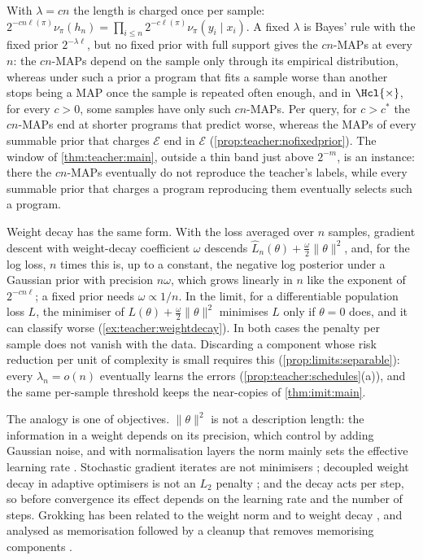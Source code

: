 \begin{remark}[$\lambda=cn$ and weight decay]\label{rem:teacher:weightdecay}
With $\lambda=cn$ the length is charged once per sample: $2^{-cn\ell(\pi)}\nu_\pi(h_n)=\prod_{i\le n}2^{-c\ell(\pi)}\nu_\pi(y_i\mid x_i)$. A fixed $\lambda$ is Bayes' rule with the fixed prior $2^{-\lambda\ell}$, but no fixed prior with full support gives the $cn$-MAPs at every $n$: the $cn$-MAPs depend on the sample only through its empirical distribution, whereas under such a prior a program that fits a sample worse than another stops being a MAP once the sample is repeated often enough, and in $\Hcl{\times}$, for every $c>0$, some samples have only such $cn$-MAPs. Per query, for $c>c^*$ the $cn$-MAPs end at shorter programs that predict worse, whereas the MAPs of every summable prior that charges $\mathcal E$ end in $\mathcal E$ (\cref{prop:teacher:nofixedprior}). The window of \cref{thm:teacher:main}, outside a thin band just above $2^{-m}$, is an instance: there the $cn$-MAPs eventually do not reproduce the teacher's labels, while every summable prior that charges a program reproducing them eventually selects such a program.

Weight decay \citep{krogh1992simple} has the same form. With the loss averaged over $n$ samples, gradient descent with weight-decay coefficient $\omega$ descends $\hat L_n(\theta)+\frac\omega2\|\theta\|^2$, and, for the log loss, $n$ times this is, up to a constant, the negative log posterior under a Gaussian prior \citep{mackay1992practical} with precision $n\omega$, which grows linearly in $n$ like the exponent of $2^{-cn\ell}$; a fixed prior needs $\omega\propto1/n$. In the limit, for a differentiable population loss $L$, the minimiser of $L(\theta)+\frac\omega2\|\theta\|^2$ minimises $L$ only if $\theta=0$ does, and it can classify worse (\cref{ex:teacher:weightdecay}). In both cases the penalty per sample does not vanish with the data. Discarding a component whose risk reduction per unit of complexity is small requires this (\cref{prop:limits:separable}): every $\lambda_n=o(n)$ eventually learns the errors (\cref{prop:teacher:schedules}(a)), and the same per-sample threshold keeps the near-copies of \cref{thm:imit:main}.

The analogy is one of objectives. $\|\theta\|^2$ is not a description length: the information in a weight depends on its precision, which \citet{hinton1993keeping} control by adding Gaussian noise, and with normalisation layers the norm mainly sets the effective learning rate \citep{vanlaarhoven2017l2}. Stochastic gradient iterates are not minimisers \citep{mandt2017stochastic}; decoupled weight decay in adaptive optimisers is not an $L_2$ penalty \citep{loshchilov2019decoupled,xie2024implicit}; and the decay acts per step, so before convergence its effect depends on the learning rate and the number of steps. Grokking \citep{power2022grokking,liu2022towards} has been related to the weight norm and to weight decay \citep{liu2023omnigrok}, and analysed as memorisation followed by a cleanup that removes memorising components \citep{nanda2023progress}.
\end{remark}
